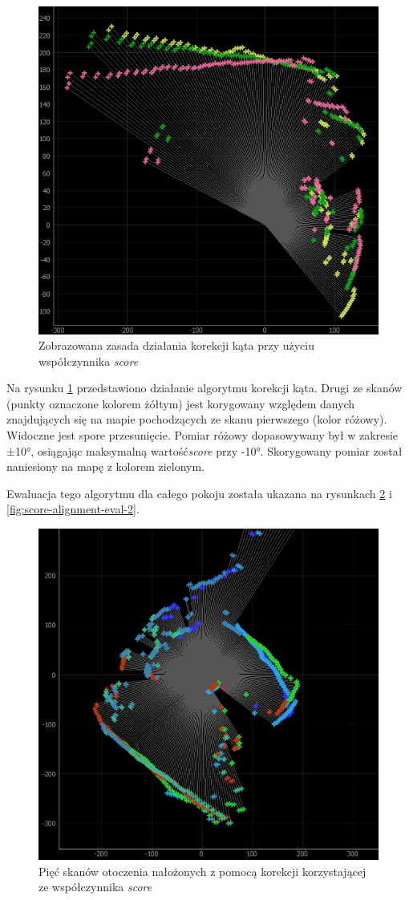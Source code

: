 \begin{figure}[ht]
	\centering
		\includegraphics[width=0.6\linewidth]{rys/ScanBot-13-angular-alignment-1yellow-2pink-3correctedgreen.PNG}
	\caption{Zobrazowana zasada działania korekcji kąta przy użyciu współczynnika \emph{score}}
	\label{fig:score-alignment-rule}
\end{figure}

Na rysunku \ref{fig:score-alignment-rule} przedstawiono działanie algorytmu korekcji kąta. Drugi ze skanów (punkty oznaczone kolorem żółtym) jest korygowany względem danych znajdujących się na mapie pochodzących ze skanu pierwszego (kolor różowy). Widoczne jest spore przesunięcie. Pomiar różowy dopasowywany był w zakresie  ±10°, osiągając maksymalną wartość\emph{score} przy -10°. Skorygowany pomiar został naniesiony na mapę z kolorem zielonym.

Ewaluacja tego algorytmu dla całego pokoju została ukazana na rysunkach \ref{fig:score-alignment-eval-1} i \ref{fig:score-alignment-eval-2}.

\begin{figure}[ht]
	\centering
		\includegraphics[width=0.6\linewidth]{rys/ScanBot-14-angular-alignment.PNG}
	\caption{Pięć skanów otoczenia nałożonych z pomocą korekcji korzystającej ze współczynnika \emph{score}}
	\label{fig:score-alignment-eval-1}
\end{figure}

